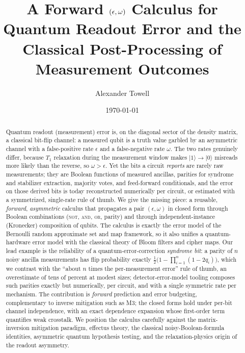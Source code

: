 \documentclass[a4paper,onecolumn,unpublished,nopdfoutputerror,allowtoday]{quantumarticle}
\title{A Forward \texorpdfstring{$(\eps,\omega)$}{(epsilon, omega)} Calculus for
Quantum Readout Error and the Classical Post-Processing of Measurement Outcomes}
\author{Alexander Towell}
\affiliation{Southern Illinois University Edwardsville \\
  \texttt{atowell@siue.edu} \\ ORCID: 0000-0001-6443-9897}
\date{\today}
\numberwithin{equation}{section}
\theoremstyle{plain}
\theoremstyle{definition}
\theoremstyle{remark}
\newcommand{\eps}{\epsilon}
\newcommand{\ket}[1]{\lvert #1 \rangle}
\begin{document}
\maketitle

\begin{abstract}
Quantum readout (measurement) error is, on the diagonal sector of the density
matrix, a classical bit-flip channel: a measured qubit is a truth value
garbled by an asymmetric channel with a false-positive rate $\eps$ and a
false-negative rate $\omega$. The two rates genuinely differ, because $T_1$
relaxation during the measurement window makes $\ket{1}\!\to\!\ket{0}$ misreads
more likely than the reverse, so $\omega > \eps$. Yet the bits a circuit
\emph{reports} are rarely raw measurements; they are Boolean functions of
measured ancillas, parities for syndrome and stabilizer extraction, majority
votes, and feed-forward conditionals, and the error on those derived bits is
today reconstructed numerically per circuit, or estimated with a symmetrized,
single-rate rule of thumb. We give the missing piece: a reusable,
\emph{forward}, \emph{asymmetric} calculus that propagates a pair $(\eps,\omega)$
in closed form through Boolean combinations (\textsc{not}, \textsc{and},
\textsc{or}, parity) and through independent-instance (Kronecker) composition of
qubits. The calculus is exactly the error model of the Bernoulli random
approximate set and map framework, so it also unifies a quantum-hardware error
model with the classical theory of Bloom filters and cipher maps. Our lead
example is the reliability of a quantum-error-correction \emph{syndrome bit}: a
parity of $n$ noisy ancilla measurements has flip probability exactly
$\tfrac12\bigl(1 - \prod_{i=1}^{n}(1-2q_i)\bigr)$, which we contrast with the
``about $n$ times the per-measurement error'' rule of thumb, an overestimate of
tens of percent at modest sizes; detector-error-model tooling composes such
parities exactly but numerically, per circuit, and with a single symmetric rate
per mechanism. The contribution is \emph{forward} prediction
and error budgeting, complementary to inverse mitigation such as M3; the closed
forms hold under per-bit channel independence, with an exact dependence
expansion whose first-order term quantifies weak crosstalk. We position the calculus carefully
against the matrix-inversion mitigation paradigm, effectus theory, the classical
noisy-Boolean-formula identities, asymmetric quantum hypothesis testing, and the
relaxation-physics origin of the readout asymmetry.
\end{abstract}
\end{document}
